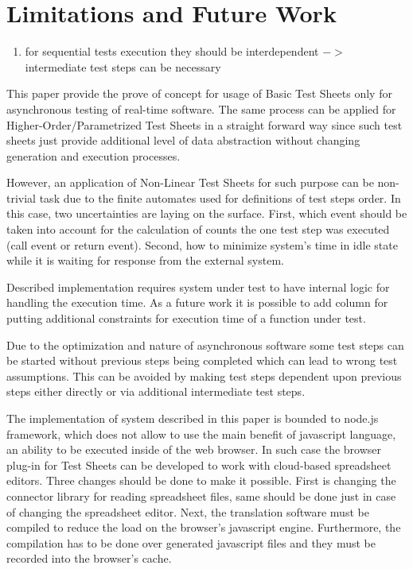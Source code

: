 

\chapter{Limitations and Future Work}
\label{chap:limits}



\begin{enumerate}
	\item for sequential tests execution they should be interdependent $->$ intermediate test steps can be necessary
\end{enumerate}

This paper provide the  prove of concept for usage of Basic Test Sheets only for asynchronous testing of real-time software. The same process can be applied for Higher-Order/Parametrized Test Sheets in a straight forward way since such test sheets just provide additional level of data abstraction without changing generation and execution processes.

However, an application of Non-Linear Test Sheets for such purpose can be non-trivial task due to the finite automates used for definitions of test steps order. In this case, two uncertainties are laying on the surface. First, which event should be taken into account for the calculation of counts the one test step was executed (call event or return event). Second, how to minimize system's time in idle state while it is waiting for response from the external system.

Described implementation requires system under test to have internal logic for handling the execution time. As a future work it is possible to add column for putting additional constraints for execution time of a function under test.

Due to the optimization and nature of asynchronous software some test steps can be started without previous steps being completed which can lead to wrong test assumptions. This can be avoided by making test steps dependent upon previous steps either directly or via additional intermediate test steps.

The implementation  of system described in this paper is bounded to node.js framework, which does not allow to use the  main benefit of javascript language, an ability to be executed inside of the web browser. In such case the browser plug-in for Test Sheets can be developed to work with cloud-based spreadsheet editors. Three changes should be done to make it possible. First is changing the connector library for reading spreadsheet files, same should be done just in case of changing the spreadsheet editor. Next, the  translation software must be compiled to reduce the load on the browser's javascript engine. Furthermore, the compilation has to be done over generated javascript files and they must be recorded into the browser's cache.


